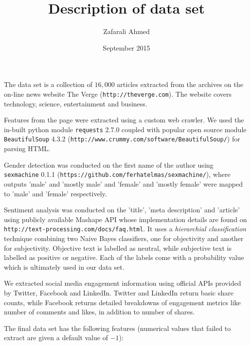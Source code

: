 \documentclass{article}
\title{Description of data set}
\author{Zafarali Ahmed}
\date{September 2015}
\begin{document}
\maketitle

The data set is a collection of $16,000$ articles extracted from the archives on the on-line news website The Verge (\texttt{http://theverge.com}). The website covers technology, science, entertainment and business. 

Features from the page were extracted using a custom web crawler. We used the in-built python module \texttt{requests} 2.7.0 coupled with popular open source module \texttt{BeautifulSoup} 4.3.2 (\texttt{http://www.crummy.com/software/BeautifulSoup/}) for parsing HTML. 

Gender detection was conducted on the first name of the author using \texttt{sexmachine} 0.1.1 (\texttt{https://github.com/ferhatelmas/sexmachine/}), where outputs 'male' and 'mostly male' and 'female' and 'mostly female' were mapped to 'male' and 'female' respectively. 

Sentiment analysis was conducted on the 'title', 'meta description' and 'article' using publicly available Mashape API whose implementation details are found on \texttt{http://text-processing.com/docs/faq.html}. It uses a \emph{hierarchial classification} technique combining two Naive Bayes classifiers, one for objectivity and another for subjectivity. Objective text is labelled as neutral, while subjective text is labelled as positive or negative. Each of the labels come with a probability value which is ultimately used in our data set.

We extracted social media engagement information using official APIs provided by Twitter, Facebook and LinkedIn. Twitter and LinkedIn return basic share counts, while Facebook returns detailed breakdowns of engagement metrics like number of comments and likes, in addition to number of shares.

The final data set has the following features (numerical values that failed to extract are given a default value of $-1$):
\end{document}
